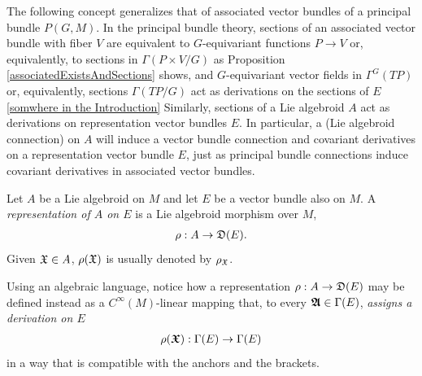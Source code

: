 










\linea

The following concept generalizes that of associated vector bundles of a principal bundle $P(G, M)$. In the principal bundle theory, sections of an associated vector bundle with fiber $V$ are equivalent to $G$-equivariant functions $P \to V$ or, equivalently, to sections in $\Gamma(P \times V/G)$ as Proposition \ref{associatedExistsAndSections} shows, and $G$-equivariant vector fields in $\Gamma^G(TP)$ or, equivalently, sections $\Gamma(TP/G)$ act as derivations on the sections of $E$ \ref{somwhere in the Introduction}%
Similarly, sections of a Lie algebroid $A$ act as derivations on representation vector bundles $E$. In particular, a (Lie algebroid connection) on $A$ will induce a vector bundle connection and covariant derivatives on a representation vector bundle $E$, just as principal bundle connections induce covariant derivatives in associated vector bundles.

\begin{definition}\label{defnRepr}
Let $A$ be a Lie algebroid on $M$ and let $E$ be a vector bundle also on $M$. A \emph{representation of $A$ on $E$} is a Lie algebroid morphism over $M$,
\begin{align}
    \rho: A \to \mathfrak{D}(E).
\end{align}
Given $\mathfrak{X} \in A$, $\rho(\mathfrak{X})$ is usually denoted by $\rho_{\mathfrak{X}}$.
\end{definition}
Using an algebraic language, notice how a representation $\rho:A \to \mathfrak{D}(E)$ may be defined instead as a $C^\infty(M)$-linear mapping that, to every $\bm{\mathfrak{A}} \in \Gamma(E)$, \emph{assigns a derivation on $E$} 
\begin{align}
    \rho(\bm{\mathfrak{X}}): \Gamma(E) \to \Gamma(E)
\end{align}
in a way that is compatible with the anchors and the brackets.

